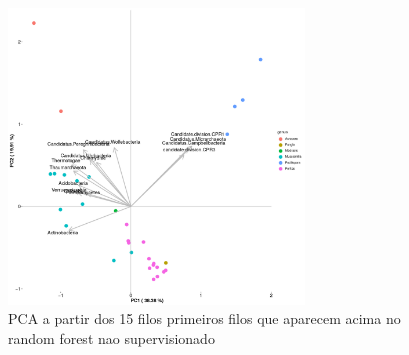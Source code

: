 \documentclass[12pt, a4paper]{report}
\begin{document}
\begin{figure}[H]
  \centering 
  \includegraphics[width=0.7\textwidth]{figures/rf_nao_supervisionado_pca_corais_15_filos_15_10_2018_edited.png}
  \caption{PCA a partir dos 15 filos primeiros filos que aparecem acima no random forest nao supervisionado}
  \end{figure}


\newpage
\end{document}
